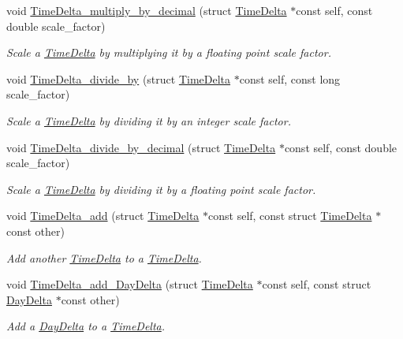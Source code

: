 \begin{DoxyCompactItemize}
void \hyperlink{time-delta_8h_a561fba60f8ba4648928fec8e18069ebb}{Time\-Delta\-\_\-multiply\-\_\-by\-\_\-decimal} (struct \hyperlink{structTimeDelta}{Time\-Delta} $\ast$const self, const double scale\-\_\-factor)
\begin{DoxyCompactList}\small\item\em Scale a \hyperlink{structTimeDelta}{Time\-Delta} by multiplying it by a floating point scale factor. \end{DoxyCompactList}\item 
void \hyperlink{time-delta_8h_a05276b8cacea5f4e576dca3a317174c4}{Time\-Delta\-\_\-divide\-\_\-by} (struct \hyperlink{structTimeDelta}{Time\-Delta} $\ast$const self, const long scale\-\_\-factor)
\begin{DoxyCompactList}\small\item\em Scale a \hyperlink{structTimeDelta}{Time\-Delta} by dividing it by an integer scale factor. \end{DoxyCompactList}\item 
void \hyperlink{time-delta_8h_acca21ee20d4addbd3925461259f4f12a}{Time\-Delta\-\_\-divide\-\_\-by\-\_\-decimal} (struct \hyperlink{structTimeDelta}{Time\-Delta} $\ast$const self, const double scale\-\_\-factor)
\begin{DoxyCompactList}\small\item\em Scale a \hyperlink{structTimeDelta}{Time\-Delta} by dividing it by a floating point scale factor. \end{DoxyCompactList}\item 
void \hyperlink{time-delta_8h_a388c9982a85d4f02741d4905fc8c3a1b}{Time\-Delta\-\_\-add} (struct \hyperlink{structTimeDelta}{Time\-Delta} $\ast$const self, const struct \hyperlink{structTimeDelta}{Time\-Delta} $\ast$const other)
\begin{DoxyCompactList}\small\item\em Add another \hyperlink{structTimeDelta}{Time\-Delta} to a \hyperlink{structTimeDelta}{Time\-Delta}. \end{DoxyCompactList}\item 
void \hyperlink{time-delta_8h_a80aa67e85468bf70b53e1eecd3f3e4cd}{Time\-Delta\-\_\-add\-\_\-\-Day\-Delta} (struct \hyperlink{structTimeDelta}{Time\-Delta} $\ast$const self, const struct \hyperlink{structDayDelta}{Day\-Delta} $\ast$const other)
\begin{DoxyCompactList}\small\item\em Add a \hyperlink{structDayDelta}{Day\-Delta} to a \hyperlink{structTimeDelta}{Time\-Delta}. \end{DoxyCompactList}\item 

\end{DoxyCompactItemize}

